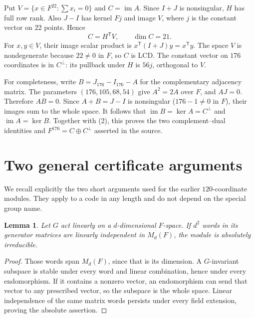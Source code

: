 \documentclass[11pt,a4paper]{article}
\newtheorem{lemma}{Lemma}
\newcommand{\im}{\operatorname{im}}
\begin{document}
Put $V=\{x\in F^{22}:\sum x_i=0\}$ and $C=\im A$. Since $I+J$ is
nonsingular, $H$ has full row rank. Also $J-I$ has kernel $Fj$ and image
$V$, where $j$ is the constant vector on $22$ points. Hence
\[
 C=H^{\mathsf T}V,\qquad \dim C=21.                  \tag{2}
\]
For $x,y\in V$, their image scalar product is
$x^{\mathsf T}(I+J)y=x^{\mathsf T}y$.
The space $V$ is nondegenerate because $22\ne0$ in $F$, so $C$ is LCD.
The constant vector on $176$ coordinates is in $C^\perp$: its pullback
under $H$ is $56j$, orthogonal to $V$.

For completeness, write $B=J_{176}-I_{176}-A$ for the complementary
adjacency matrix. The parameters $(176,105,68,54)$ give $A^2=2A$ over
$F$, and $AJ=0$. Therefore $AB=0$. Since $A+B=J-I$ is nonsingular
($176-1\ne0$ in $F$), their images sum to the whole space. It follows
that $\im B=\ker A=C^\perp$ and $\im A=\ker B$.
Together with (2), this proves the two complement--dual identities and
$F^{176}=C\oplus C^\perp$ asserted in the source.

\section{Two general certificate arguments}
We recall explicitly the two short arguments used for the earlier
$120$-coordinate modules. They apply to a code in any length and do not
depend on the special group name.

\begin{lemma}\label{lem:matrix}
Let $G$ act linearly on a $d$-dimensional $F$-space. If $d^2$ words in its
generator matrices are linearly independent in $M_d(F)$, the module is
absolutely irreducible.
\end{lemma}
\begin{proof}
Those words span $M_d(F)$, since that is its dimension. A $G$-invariant
subspace is stable under every word and linear combination, hence under
every endomorphism. If it contains a nonzero vector, an endomorphism can
send that vector to any prescribed vector, so the subspace is the whole
space. Linear independence of the same matrix words persists under every
field extension, proving the absolute assertion.
\end{proof}
\end{document}

